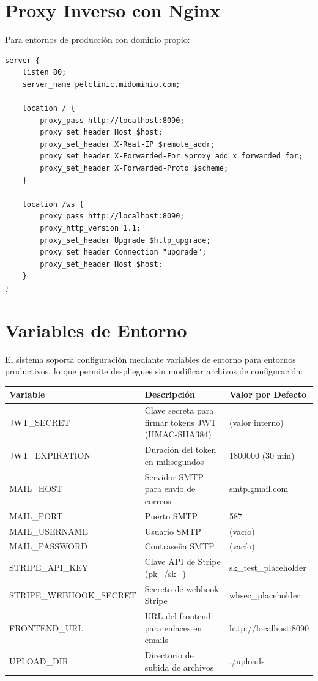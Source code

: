 \section{Proxy Inverso con Nginx}

Para entornos de producci\'on con dominio propio:

\begin{lstlisting}[caption=Configuraci\'on de Nginx como proxy inverso]
server {
    listen 80;
    server_name petclinic.midominio.com;

    location / {
        proxy_pass http://localhost:8090;
        proxy_set_header Host $host;
        proxy_set_header X-Real-IP $remote_addr;
        proxy_set_header X-Forwarded-For $proxy_add_x_forwarded_for;
        proxy_set_header X-Forwarded-Proto $scheme;
    }

    location /ws {
        proxy_pass http://localhost:8090;
        proxy_http_version 1.1;
        proxy_set_header Upgrade $http_upgrade;
        proxy_set_header Connection "upgrade";
        proxy_set_header Host $host;
    }
}
\end{lstlisting}

\section{Variables de Entorno}

El sistema soporta configuraci\'on mediante variables de entorno para entornos productivos, lo que permite despliegues sin modificar archivos de configuraci\'on:

\begin{longtable}{|p{4cm}|p{6cm}|p{4cm}|}
\hline
\textbf{Variable} & \textbf{Descripci\'on} & \textbf{Valor por Defecto} \\
\hline
JWT\_SECRET & Clave secreta para firmar tokens JWT (HMAC-SHA384) & (valor interno) \\
JWT\_EXPIRATION & Duraci\'on del token en milisegundos & 1800000 (30 min) \\
MAIL\_HOST & Servidor SMTP para env\'io de correos & smtp.gmail.com \\
MAIL\_PORT & Puerto SMTP & 587 \\
MAIL\_USERNAME & Usuario SMTP & (vac\'io) \\
MAIL\_PASSWORD & Contrase\~na SMTP & (vac\'io) \\
STRIPE\_API\_KEY & Clave API de Stripe (pk\_/sk\_) & sk\_test\_placeholder \\
STRIPE\_WEBHOOK\_SECRET & Secreto de webhook Stripe & whsec\_placeholder \\
FRONTEND\_URL & URL del frontend para enlaces en emails & http://localhost:8090 \\
UPLOAD\_DIR & Directorio de subida de archivos & ./uploads \\
\hline
\end{longtable}

